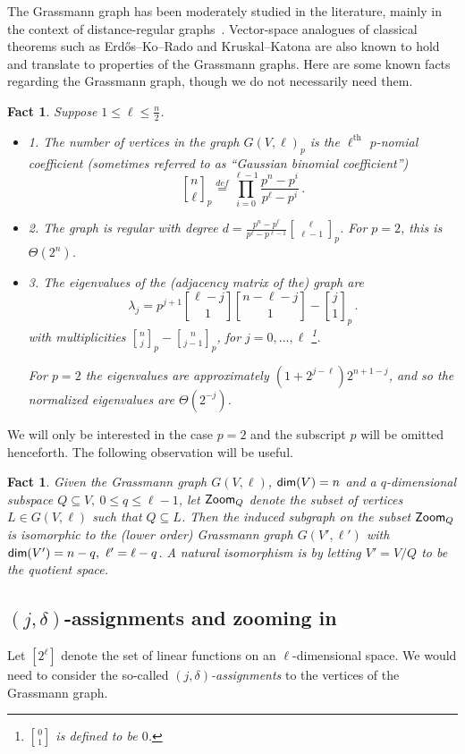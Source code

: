 \documentclass[11pt]{article}
\numberwithin{equation}{section}
\newtheorem{fact}[theorem]{Fact}
\theoremstyle{definition}
\theoremstyle{plain}
\newcommand\defeq{\stackrel{def}{=}}
\renewcommand\leq{\leqslant}
\begin{document}
%
The Grassmann graph has been moderately studied in the literature, mainly in the context of distance-regular graphs~\cite{BCN12}.
%
%
Vector-space analogues of classical %
theorems such as
%
%
Erd\H{o}s--Ko--Rado and Kruskal--Katona %
are also known to hold~\cite{CP10}  %
and translate to properties of the Grassmann graphs.  %
Here are some
known facts regarding the Grassmann graph, though we do not necessarily need them.
\begin{fact}
Suppose $1 \leq \ell \leq \frac{n}{2}$.
\begin{itemize}
\item[] 1. The number of vertices in the graph $G(V, \ell)_p$  is the $\ell^{\mbox{th}}$ $p$-nomial coefficient (sometimes referred to as ``Gaussian binomial coefficient'')
\[
{n \brack \ell}_p \defeq \prod\limits_{i=0}^{\ell-1}{\frac{p^{n}-p^{i}}{p^{\ell}-p^{i}}}\,.%
\]
\item[] 2. The graph is regular with degree $d=\frac{p^n-p^\ell}{p^\ell-p^{\ell-1}}{\ell \brack \ell-1}_p$.  For $p=2$,  this is $\Theta(2^n)$.
\item[] 3. The eigenvalues of the (adjacency matrix of the) graph are
\[
\lambda_j = p^{j+1}{\ell-j \brack 1}{n-\ell-j \brack 1}  - {j \brack 1}_p\,.%
\]
with multiplicities ${n \brack j}_p - {n\brack j-1}_p$, for $j=0,...,\ell$ \footnote{${0 \brack 1}$  is defined to be $0$.}.

For $p=2$ the eigenvalues are approximately $(1+2^{j-\ell})2^{n+1-j}$, and so the normalized eigenvalues are $\Theta(2^{-j})$.
\end{itemize}
\end{fact}
We will only be interested in the case $p=2$ and the subscript $p$ will be omitted henceforth. The following observation will be useful.
\begin{fact}\label{fact:isomorphic}
Given the Grassmann graph $G(V,\ell)$,
${\sf dim}(V) = n$ and a $q$-dimensional subspace $Q \subseteq V, ~0 \leq q \leq \ell-1$, let ${\sf Zoom}_Q$ denote the subset
of vertices  $L \in G(V,\ell)$ such that $Q \subseteq L$. Then the induced subgraph on the subset ${\sf Zoom}_Q$ is isomorphic to
the (lower order) Grassmann graph $G(V',\ell')$ with ${\sf dim}(V')=n-q, ~\ell' = \ell- q$. A natural isomorphism is by letting
$V' = V/Q$ to be the quotient space.
\end{fact}

%
\subsection{\texorpdfstring{$(j,\delta)$}{(j,delta)}-assignments and zooming in}
Let $[2^\ell]$ denote the set of linear functions on an $\ell$-dimensional space. We would need to consider
the so-called \emph{$(j,\delta)$-assignments} %
%
to the vertices of the Grassmann graph.
\end{document}
